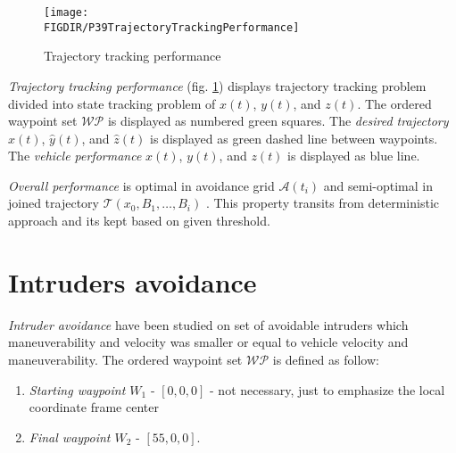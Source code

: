 \begin{figure}[H]
    \centering
    \texttt{[image: \\FIGDIR/P39TrajectoryTrackingPerformance]}
    \caption{Trajectory tracking performance}
    \label{fig:P39TrajectoryTrackingPerformance}
\end{figure}

\noindent\emph{Trajectory tracking performance} (fig. \ref{fig:P39TrajectoryTrackingPerformance}) displays trajectory tracking problem divided into state tracking problem of $x(t)$, $y(t)$, and $z(t)$. The ordered waypoint set $\mathscr{WP}$ is displayed as numbered green squares. The \emph{desired trajectory} $\hat{x}(t)$, $\hat{y}(t)$, and $\hat{z}(t)$ is displayed as green dashed line between waypoints. The \emph{vehicle performance} $x(t)$, $y(t)$, and $z(t)$ is displayed as blue  line. 

\emph{Overall performance} is optimal in avoidance grid $\mathscr{A}(t_i)$ and semi-optimal in joined trajectory $\mathscr{T}(x_0,B_1,\dots,B_i)$ \cite{alojzgomola2017}. This property transits from deterministic approach and its kept based on given threshold.

\section{Intruders avoidance}
\noindent \emph{Intruder avoidance} have been studied on set of avoidable intruders which maneuverability and velocity was smaller or equal to vehicle  velocity and maneuverability.
\noindent The ordered waypoint set $\mathscr{WP}$ is defined as follow:
\begin{enumerate}
    \item\emph{Starting waypoint $W_1$} - $[0,0,0]$ - not necessary, just to emphasize the local coordinate frame center
    \item\emph{Final waypoint $W_2$} - $[55,0,0]$.
\end{enumerate}


